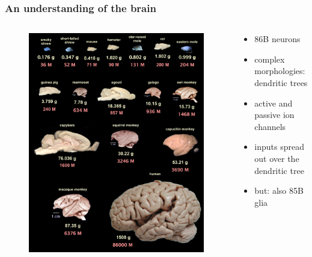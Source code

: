 \begin{frame}[c]
  \frametitle{An understanding of the brain}
  \begin{columns}
    \begin{column}{0.5\textwidth}
      \begin{figure}[h]
        \centering
        \includegraphics[width=\textwidth]{99_images/brain-sizes.jpg}
      \end{figure}
    \end{column}
    \begin{column}{0.5\textwidth}
      \begin{itemize}
        \item \alert{86B} neurons\footnotemark{}
          \pause{}
        \item complex \alert{morphologies:} dendritic trees
        \item active and passive \alert{ion channels}
        \item \alert{inputs} spread out over the dendritic tree
          \pause{}
        \item but: also 85B \alert{glia}
      \end{itemize}
    \end{column}
  \end{columns}
  \vspace{0.2cm}
\end{frame}
